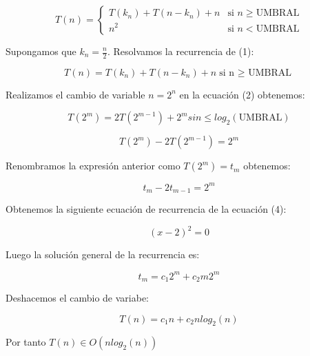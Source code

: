 \documentclass{homework}
\begin{document}
    \begin{equation}
        T(n) = \left\{ \begin{array}{lr} T(k_n) + T(n-k_n) + n & \text{si } n \geq \text{UMBRAL}\\ n^2 & \text{si } n < \text{UMBRAL} \end{array} \right.
    \end{equation}

    Supongamos que $k_{n} = \frac{n}{2}$. Resolvamos la recurrencia de (1):
    
    \begin{equation}
        T(n) = T(k_n) + T(n-k_n) + n \text{si n $\geq$ UMBRAL}
    \end{equation}

    Realizamos el cambio de variable $n = 2^{n}$ en la ecuación (2) obtenemos:

    \begin{equation}
        T(2^{m}) = 2T(2^{m-1}) + 2^{m} si n \leqslant log_{2}(\text{UMBRAL}) 
    \end{equation}

    \begin{equation}
        T(2^{m}) - 2T(2^{m-1}) = 2^{m}
    \end{equation}

    Renombramos la expresión anterior como $T(2^{m}) = t_{m}$ obtenemos:

    \begin{equation}
        t_{m} - 2t_{m-1} = 2^{m}
    \end{equation}
    
    Obtenemos la siguiente ecuación de recurrencia de la ecuación (4):

    \begin{equation}
        (x-2)^{2} = 0
    \end{equation}

    Luego la solución general de la recurrencia es:

    \begin{equation}
        t_{m} = c_{1}2^{m} + c_{2}m2^{m}
    \end{equation}

    Deshacemos el cambio de variabe:

    \begin{equation}
        T(n) = c_{1}n + c_{2}nlog_{2}(n)
    \end{equation}

    Por tanto $T(n) \in O(nlog_{2}(n))$
    
\end{document}
